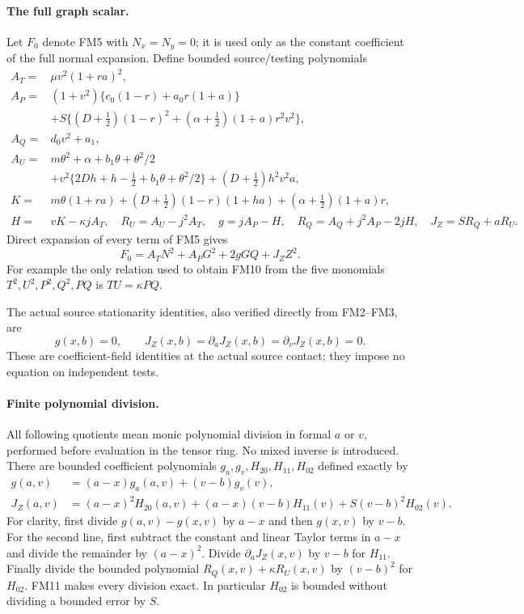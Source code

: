 \paragraph{The full graph scalar.}
Let $F_0$ denote FM5 with $N_x=N_y=0$; it is used only as the
constant coefficient of the full normal expansion. Define bounded
source/testing polynomials
\[
\begin{split}
 A_T={}&\mu v^2(1+ra)^2,\\
 A_P={}&(1+v^2)\{c_0(1-r)+a_0r(1+a)\}\\
       &+S\{(D+\tfrac12)(1-r)^2+
                   (\alpha+\tfrac12)(1+a)r^2v^2\},\\
 A_Q={}&d_0v^2+a_1,\\
 A_U={}&m\theta^2+\alpha+b_1\theta+\theta^2/2\\
       &+v^2\{2Dh+h-\tfrac12+b_1\theta+\theta^2/2\}
              +(D+\tfrac12)h^2v^2a,\\
 K={}&m\theta(1+ra)+(D+\tfrac12)(1-r)(1+ha)
                         +(\alpha+\tfrac12)(1+a)r,\\
 H={}&vK-\kappa jA_T,\quad R_U=A_U-j^2A_T,\quad
 g=jA_P-H,\quad R_Q=A_Q+j^2A_P-2jH,\quad
 J_Z=SR_Q+aR_U.
\end{split}\tag{FM9}
\]
Direct expansion of every term of FM5 gives
\[
 F_0=A_TN^2+A_PG^2+2gGQ+J_ZZ^2.
 \tag{FM10}
\]
For example the only relation used to obtain FM10 from the
five monomials $T^2,U^2,P^2,Q^2,PQ$ is $TU=\kappa PQ$.

The actual source stationarity identities, also verified directly
from FM2--FM3, are
\[
 g(x,b)=0,\qquad
 J_Z(x,b)=\partial_aJ_Z(x,b)=\partial_vJ_Z(x,b)=0.
 \tag{FM11}
\]
These are coefficient-field identities at the actual source
contact; they impose no equation on independent tests.

\paragraph{Finite polynomial division.}
All following quotients mean monic polynomial division in formal
$a$ or $v$, performed before evaluation in the tensor ring. No
mixed inverse is introduced. There are bounded coefficient
polynomials $g_a,g_v,H_{20},H_{11},H_{02}$ defined exactly by
\[
\begin{split}
 g(a,v)&=(a-x)g_a(a,v)+(v-b)g_v(v),\\
 J_Z(a,v)&=(a-x)^2H_{20}(a,v)+(a-x)(v-b)H_{11}(v)
                                      +S(v-b)^2H_{02}(v).
\end{split}\tag{FM12}
\]
For clarity, first divide $g(a,v)-g(x,v)$ by $a-x$ and then
$g(x,v)$ by $v-b$. For the second line, first subtract the
constant and linear Taylor terms in $a-x$ and divide the remainder
by $(a-x)^2$. Divide $\partial_aJ_Z(x,v)$ by $v-b$ for $H_{11}$.
Finally divide the bounded polynomial
$R_Q(x,v)+\kappa R_U(x,v)$ by $(v-b)^2$ for $H_{02}$.
FM11 makes every division exact. In particular $H_{02}$ is
bounded without dividing a bounded error by $S$.

